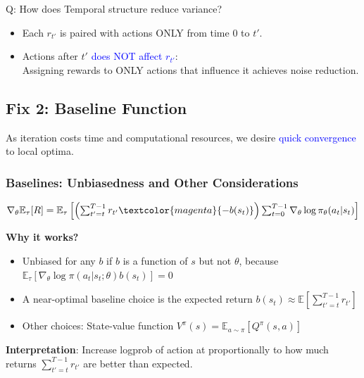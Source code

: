 \documentclass{article}
\begin{document}
\begin{hintbox}
    Q: How does Temporal structure reduce variance?
    \begin{prfbox}
        \begin{itemize}
        \item Each $r_{t'}$ is paired with actions ONLY from time 0 to $t'$.
        \item Actions after $t'$ \textcolor{blue}{does NOT affect $r_{t'}$}:
            \\Assigning rewards to ONLY actions that influence it achieves noise reduction.
        \end{itemize}
    \end{prfbox}
\end{hintbox}

\subsection{Fix 2: Baseline Function}
As iteration costs time and computational resources, we desire \textcolor{blue}{quick convergence} to local optima.

\begin{thmbox}
    \subsubsection*{Baselines: Unbiasedness and Other Considerations}
    $\nabla_{\theta} \mathbb{E}_{\tau} [R] = \mathbb{E}_{\tau} \left[ \left(\sum_{t' = t}^{T-1} r_{t'} \textcolor{magenta}{- b(s_t)} \right) \sum_{t=0}^{T-1} \nabla_{\theta} \log \pi_{\theta} (a_t | s_t) \right]$

    \textbf{Why it works?}
    \begin{itemize}
    \item Unbiased for any $b$ if $b$ is a function of $s$ but not $\theta$, because
        \\$\mathbb{E}_{\tau} \left[ \nabla_{\theta} \log \pi(a_t | s_t; \theta) b(s_t) \right] = 0$
    \item A near-optimal baseline choice is the expected return 
        $b(s_t) \approx \mathbb{E} \left[ \sum_{t' = t}^{T-1} r_{t'} \right]$
    \item Other choices: State-value function $V^{\pi}(s) = \mathbb{E}_{a \sim \pi} \left[ Q^{\pi} (s, a) \right]$
    \end{itemize}
    \textbf{Interpretation}: Increase logprob of action at proportionally to how much returns 
    $\sum^{T-1}_{t'= t} r_{t'}$ are better than expected.
\end{thmbox}
\end{document}
